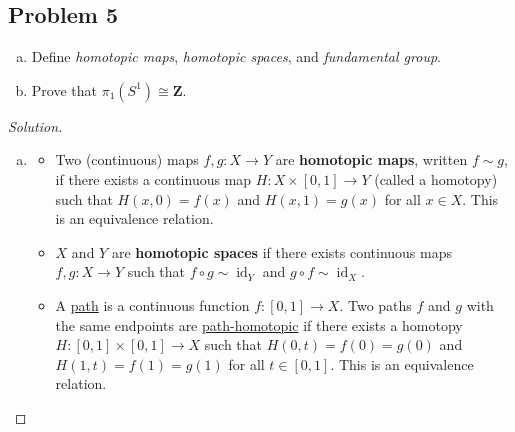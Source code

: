 \documentclass[12pt]{article}
\newcommand{\ita}[1]{\textit{#1}}
\theoremstyle{definition}
\DeclareMathOperator\id{id}
\begin{document}
\subsection{Problem 5 \texorpdfstring{\cite{Munkres}}{}}
\begin{enumerate}[(a)]
    \item Define \ita{homotopic maps}, \ita{homotopic spaces}, and \ita{fundamental group}.
    \item Prove that $\pi_1 (S^1) \cong \mathbf{Z}$.
\end{enumerate}
\begin{proof}[Solution]
    \noindent
    \begin{enumerate}[(a)]
        \item 
        \begin{itemize}
            \item Two (continuous) maps $f, g : X \to Y$ are \textbf{homotopic maps}, written $f \sim g$, if there exists a continuous map $H : X \times [0,1] \to Y$ (called a homotopy) such that $H(x,0) = f(x)$ and $H(x,1) = g(x)$ for all $x \in X$. This is an equivalence relation.
            \item $X$ and $Y$ are \textbf{homotopic spaces} if there exists continuous maps $f, g : X \to Y$ such that $f \circ g \sim \id_{Y}$ and $g \circ f \sim \id_{X}$.
            \item A \underline{path} is a continuous function $f : [0,1] \to X$. Two paths $f$ and $g$ with the same endpoints are \underline{path-homotopic} if there exists a homotopy $H : [0,1] \times [0,1] \to X$ such that $H(0,t) = f(0) = g(0)$ and $H(1,t) = f(1) = g(1)$ for all $t \in [0,1]$. This is an equivalence relation.
            

\end{itemize}
\end{enumerate}
\end{proof}
\end{document}
